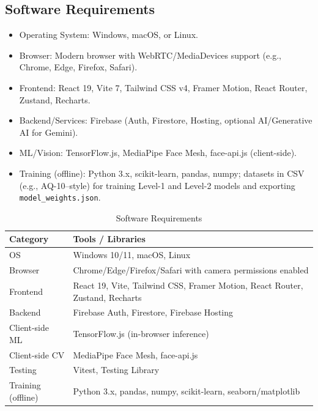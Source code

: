 \documentclass[12pt,a4paper]{report}
\begin{document}
\subsection{Software Requirements}
\begin{itemize}
    \item Operating System: Windows, macOS, or Linux.
    \item Browser: Modern browser with WebRTC/MediaDevices support (e.g., Chrome, Edge, Firefox, Safari).
    \item Frontend: React 19, Vite 7, Tailwind CSS v4, Framer Motion, React Router, Zustand, Recharts.
    \item Backend/Services: Firebase (Auth, Firestore, Hosting, optional AI/Generative AI for Gemini).
    \item ML/Vision: TensorFlow.js, MediaPipe Face Mesh, face-api.js (client-side).
    \item Training (offline): Python 3.x, scikit-learn, pandas, numpy; datasets in CSV (e.g., AQ-10–style) for training Level-1 and Level-2 models and exporting \texttt{model\_weights.json}.
\end{itemize}
\begin{table}[!htbp]
    \centering
    \caption{Software Requirements}
    \renewcommand{\arraystretch}{1.35}
    \begin{tabular}{|p{4.2cm}|p{9.2cm}|}
        \hline
        \textbf{Category} & \textbf{Tools / Libraries} \\
        \hline
        OS & Windows 10/11, macOS, Linux \\
        \hline
        Browser & Chrome/Edge/Firefox/Safari with camera permissions enabled \\
        \hline
        Frontend & React 19, Vite, Tailwind CSS, Framer Motion, React Router, Zustand, Recharts \\
        \hline
        Backend & Firebase Auth, Firestore, Firebase Hosting \\
        \hline
        Client-side ML & TensorFlow.js (in-browser inference) \\
        \hline
        Client-side CV & MediaPipe Face Mesh, face-api.js \\
        \hline
        Testing & Vitest, Testing Library \\
        \hline
        Training (offline) & Python 3.x, pandas, numpy, scikit-learn, seaborn/matplotlib \\
        \hline
    \end{tabular}
\end{table}
\end{document}

